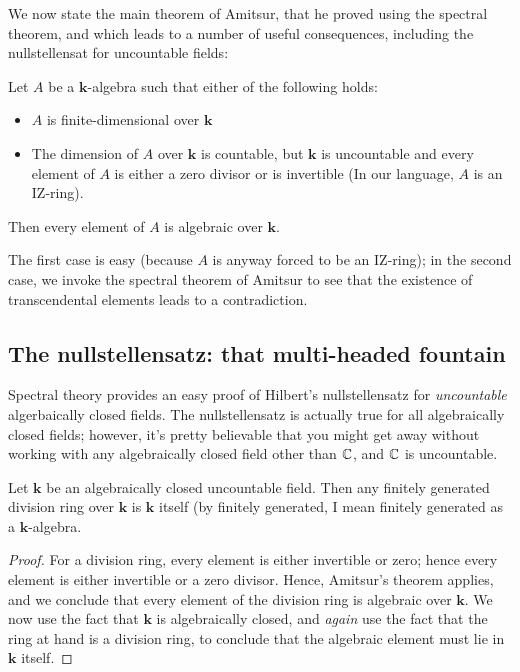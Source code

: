 \documentclass[a4paper]{amsart}
\newcommand{\field}{\mathbf{k}}
\begin{document}
We now state the main theorem of Amitsur, that he proved using the
spectral theorem, and which leads to a number of useful consequences,
including the nullstellensat for uncountable fields:

\begin{theorem}
  Let $A$ be a $\field$-algebra such that either of the following holds:
  
  \begin{itemize}

  \item $A$ is finite-dimensional over $\field$

  \item The dimension of $A$ over $\field$ is countable, but $\field$
    is uncountable and every element of $A$ is either a zero divisor
    or is invertible (In our language, $A$ is an IZ-ring).

  \end{itemize}

  Then every element of $A$ is algebraic over $\field$.
\end{theorem}

The first case is easy (because $A$ is anyway forced to be an
IZ-ring); in the second case, we invoke the spectral theorem of
Amitsur to see that the existence of transcendental elements leads to
a contradiction.

\subsection{The nullstellensatz: that multi-headed fountain}

Spectral theory provides an easy proof of Hilbert's nullstellensatz
for {\em uncountable} algerbaically closed fields. The nullstellensatz
is actually true for all algebraically closed fields; however, it's
pretty believable that you might get away without working with any
algebraically closed field other than $\mathbb{C}$, and $\mathbb{C}$ is uncountable.

\begin{theorem}
  Let $\field$ be an algebraically closed uncountable field.  Then any
  finitely generated division ring over $\field$ is $\field$ itself
  (by finitely generated, I mean finitely generated as a
  $\field$-algebra.
\end{theorem}

\begin{proof}
  For a division ring, every element is either invertible or zero;
  hence every element is either invertible or a zero divisor. Hence,
  Amitsur's theorem applies, and we conclude that every element of the
  division ring is algebraic over $\field$. We now use the fact that
  $\field$ is algebraically closed, and {\em again} use the fact that
  the ring at hand is a division ring, to conclude that the algebraic
  element must lie in $\field$ itself.
\end{proof}
\end{document}

